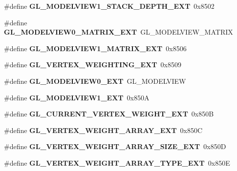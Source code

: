 \begin{DoxyCompactItemize}
\item 
\#define {\bfseries G\+L\+\_\+\+M\+O\+D\+E\+L\+V\+I\+E\+W1\+\_\+\+S\+T\+A\+C\+K\+\_\+\+D\+E\+P\+T\+H\+\_\+\+E\+X\+T}~0x8502\label{_s_d_l__opengl_8h_adc8e6c9fdc62d6a62a7f87c3e652d13c}

\item 
\#define {\bfseries G\+L\+\_\+\+M\+O\+D\+E\+L\+V\+I\+E\+W0\+\_\+\+M\+A\+T\+R\+I\+X\+\_\+\+E\+X\+T}~G\+L\+\_\+\+M\+O\+D\+E\+L\+V\+I\+E\+W\+\_\+\+M\+A\+T\+R\+I\+X\label{_s_d_l__opengl_8h_a180959316973cf5e7282cf14f59c7bec}

\item 
\#define {\bfseries G\+L\+\_\+\+M\+O\+D\+E\+L\+V\+I\+E\+W1\+\_\+\+M\+A\+T\+R\+I\+X\+\_\+\+E\+X\+T}~0x8506\label{_s_d_l__opengl_8h_ad52e7281fe368e52ee4ab32fff23e091}

\item 
\#define {\bfseries G\+L\+\_\+\+V\+E\+R\+T\+E\+X\+\_\+\+W\+E\+I\+G\+H\+T\+I\+N\+G\+\_\+\+E\+X\+T}~0x8509\label{_s_d_l__opengl_8h_a790db2025ca25cf2264deba59e9a4039}

\item 
\#define {\bfseries G\+L\+\_\+\+M\+O\+D\+E\+L\+V\+I\+E\+W0\+\_\+\+E\+X\+T}~G\+L\+\_\+\+M\+O\+D\+E\+L\+V\+I\+E\+W\label{_s_d_l__opengl_8h_af791b79963f830c7c6e3f899e384bcb4}

\item 
\#define {\bfseries G\+L\+\_\+\+M\+O\+D\+E\+L\+V\+I\+E\+W1\+\_\+\+E\+X\+T}~0x850\+A\label{_s_d_l__opengl_8h_a270cba62cd911b9ebdd13720844d00cd}

\item 
\#define {\bfseries G\+L\+\_\+\+C\+U\+R\+R\+E\+N\+T\+\_\+\+V\+E\+R\+T\+E\+X\+\_\+\+W\+E\+I\+G\+H\+T\+\_\+\+E\+X\+T}~0x850\+B\label{_s_d_l__opengl_8h_a4a08496aa30c806e8c0bf14192db91c7}

\item 
\#define {\bfseries G\+L\+\_\+\+V\+E\+R\+T\+E\+X\+\_\+\+W\+E\+I\+G\+H\+T\+\_\+\+A\+R\+R\+A\+Y\+\_\+\+E\+X\+T}~0x850\+C\label{_s_d_l__opengl_8h_a7058ed209421bfa7d420cde9bf226966}

\item 
\#define {\bfseries G\+L\+\_\+\+V\+E\+R\+T\+E\+X\+\_\+\+W\+E\+I\+G\+H\+T\+\_\+\+A\+R\+R\+A\+Y\+\_\+\+S\+I\+Z\+E\+\_\+\+E\+X\+T}~0x850\+D\label{_s_d_l__opengl_8h_ac4118692640456a97e69e586396c7400}

\item 
\#define {\bfseries G\+L\+\_\+\+V\+E\+R\+T\+E\+X\+\_\+\+W\+E\+I\+G\+H\+T\+\_\+\+A\+R\+R\+A\+Y\+\_\+\+T\+Y\+P\+E\+\_\+\+E\+X\+T}~0x850\+E\label{_s_d_l__opengl_8h_a8d3470c8d07104d3582ba61741b7a07d}


\end{DoxyCompactItemize}
